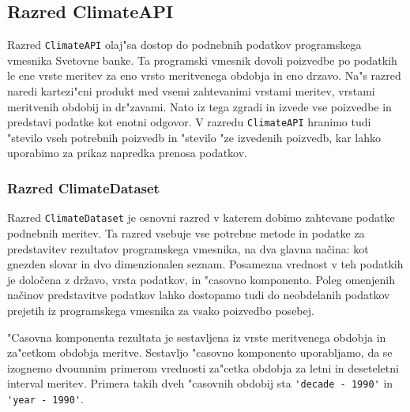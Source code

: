 % 
% 
% 


\subsection{Razred ClimateAPI}

Razred \verb|ClimateAPI| olaj"sa dostop do podnebnih podatkov programskega
vmesnika Svetovne banke. Ta programski vmesnik dovoli poizvedbe po podatkih le 
ene vrste meritev za eno vrsto meritvenega obdobja in eno drzavo. Na"s razred 
naredi kartezi"cni produkt med vsemi zahtevanimi vrstami meritev, vrstami
meritvenih obdobij in dr"zavami. Nato iz tega zgradi in izvede vse poizvedbe 
in predstavi podatke kot enotni odgovor. V razredu \verb|ClimateAPI| hranimo 
tudi "stevilo vseh potrebnih poizvedb in "stevilo "ze izvedenih poizvedb, kar 
lahko uporabimo za prikaz napredka prenosa podatkov.



\subsubsection{Razred ClimateDataset}

Razred \verb|ClimateDataset| je osnovni razred v katerem dobimo zahtevane 
podatke podnebnih meritev. Ta razred vsebuje vse potrebne metode in podatke za 
predstavitev rezultatov programskega vmesnika, na dva glavna načina: kot
gnezden slovar in dvo dimenzionalen seznam. Posamezna vrednost v teh podatkih
je določena z državo, vrsta podatkov, in "casovno komponento. Poleg omenjenih
načinov predstavitve podatkov lahko dostopamo tudi do neobdelanih podatkov 
prejetih iz programskega vmesnika za vsako poizvedbo posebej.

"Casovna komponenta rezultata je sestavljena iz vrste meritvenega obdobja in 
za"cetkom obdobja meritve. Sestavljo "casovno komponento uporabljamo, da se 
izognemo dvoumnim primerom vrednosti za"cetka obdobja za letni in deseteletni 
interval meritev. Primera takih dveh "casovnih obdobij sta 
\verb|'decade - 1990'| in \verb|'year - 1990'|.


